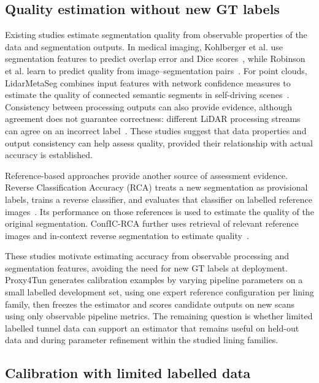 \documentclass[a4paper,fleqn]{cas-dc}
\begin{document}
{\subsection{Quality estimation without new GT labels}

Existing studies estimate segmentation quality from observable properties of the data and segmentation outputs. In medical imaging, Kohlberger et al. use segmentation features to predict overlap error and Dice scores~\cite{kohlberger2012evaluating}, while Robinson et al. learn to predict quality from image--segmentation pairs~\cite{robinson2018segmentationQuality}. For point clouds, LidarMetaSeg combines input features with network confidence measures to estimate the quality of connected semantic segments in self-driving scenes~\cite{colling2021lidarmetaseg}. Consistency between processing outputs can also provide evidence, although agreement does not guarantee correctness: different LiDAR processing streams can agree on an incorrect label~\cite{bogdoll2025labelfree}. These studies suggest that data properties and output consistency can help assess quality, provided their relationship with actual accuracy is established.

Reference-based approaches provide another source of assessment evidence. Reverse Classification Accuracy (RCA) treats a new segmentation as provisional labels, trains a reverse classifier, and evaluates that classifier on labelled reference images~\cite{valindria2017rca}. Its performance on those references is used to estimate the quality of the original segmentation. ConfIC-RCA further uses retrieval of relevant reference images and in-context reverse segmentation to estimate quality~\cite{cosarinsky2026conficrca}.

These studies motivate estimating accuracy from observable processing and segmentation features, avoiding the need for new GT labels at deployment. Proxy4Tun generates calibration examples by varying pipeline parameters on a small labelled development set, using one expert reference configuration per lining family, then freezes the estimator and scores candidate outputs on new scans using only observable pipeline metrics. The remaining question is whether limited labelled tunnel data can support an estimator that remains useful on held-out data and during parameter refinement within the studied lining families.

\subsection{Calibration with limited labelled data}

}
\end{document}
